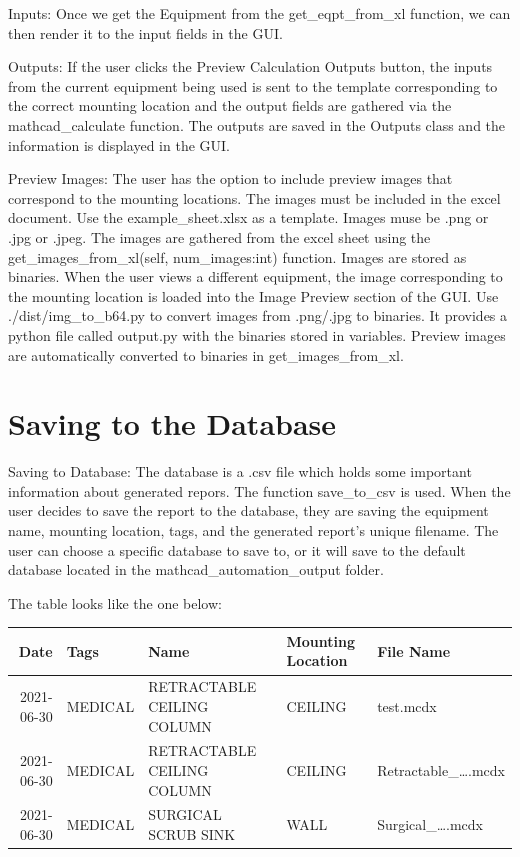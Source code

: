 \documentclass[11pt]{article}
\begin{document}
Inputs: Once we get the Equipment from the get\_eqpt\_from\_xl function, we can then render it to the input fields in the GUI.

Outputs: If the user clicks the Preview Calculation Outputs button, the inputs from the current equipment being used is sent to the template corresponding to the correct mounting location and the output fields are gathered via the mathcad\_calculate function. The outputs are saved in the Outputs class and the information is displayed in the GUI.

Preview Images: The user has the option to include preview images that correspond to the mounting locations. The images must be included in the excel document. Use the example\_sheet.xlsx as a template. Images muse be .png or .jpg or .jpeg. The images are gathered from the excel sheet using the get\_images\_from\_xl(self, num\_images:int) function. Images are stored as binaries. When the user views a different equipment, the image corresponding to the mounting location is loaded into the Image Preview section of the GUI. Use ./dist/img\_to\_b64.py to convert images from .png/.jpg to binaries. It provides a python file called output.py with the binaries stored in variables. Preview images are automatically converted to binaries in get\_images\_from\_xl.

\section{Saving to the Database}
\label{sec:orgfbd5cba}

Saving to Database: The database is a .csv file which holds some important information about generated repors. The function save\_to\_csv is used. When the user decides to save the report to the database, they are saving the equipment name, mounting location, tags, and the generated report's unique filename. The user can choose a specific database to save to, or it will save to the default database located in the mathcad\_automation\_output folder.

The table looks like the one below:
\begin{center}
\begin{tabular}{rllll}
\hline
Date & Tags & Name & Mounting Location & File Name\\
\hline
2021-06-30 & MEDICAL & RETRACTABLE CEILING COLUMN & CEILING & test.mcdx\\
2021-06-30 & MEDICAL & RETRACTABLE CEILING COLUMN & CEILING & Retractable\_\ldots{}.mcdx\\
2021-06-30 & MEDICAL & SURGICAL SCRUB SINK & WALL & Surgical\_\ldots{}.mcdx\\
\hline
\end{tabular}
\end{center}
\end{document}
